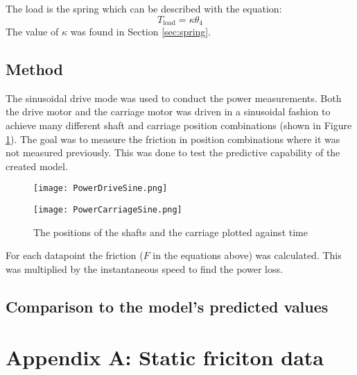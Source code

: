 \documentclass[12pt]{article}
\begin{document}
The load is the spring which can be described with the equation:
$$ T_{\text{load}} = \kappa \theta_4$$
The value of $\kappa$ was found in Section \ref{sec:spring}.


\subsection{Method}
The sinusoidal drive mode was used to conduct the power measurements. Both the drive motor and the carriage motor was driven in a sinusoidal fashion to achieve many different shaft and carriage position combinations (shown in Figure \ref{fig:powerSines}). The goal was to measure the friction in position combinations where it was not measured previously. This was done to test the predictive capability of the created model.\\

\begin{figure}[!h]
    \centering
    \begin{minipage}{0.49\textwidth}       
         \texttt{[image: PowerDriveSine.png]}
    \end{minipage}
    \begin{minipage}{0.49\textwidth}       
         \texttt{[image: PowerCarriageSine.png]}
    \end{minipage}
\label{fig:powerSines}
\caption{The positions of the shafts and the carriage plotted against time}
\end{figure}


For each datapoint the friction ($F$ in the equations above) was calculated. This was multiplied by the instantaneous speed to find the power loss. 

\clearpage
\subsection{Comparison to the model's predicted values}
\clearpage

\printbibliography

\clearpage
{}
\section*{Appendix A: Static friciton data}
%
\end{document}
